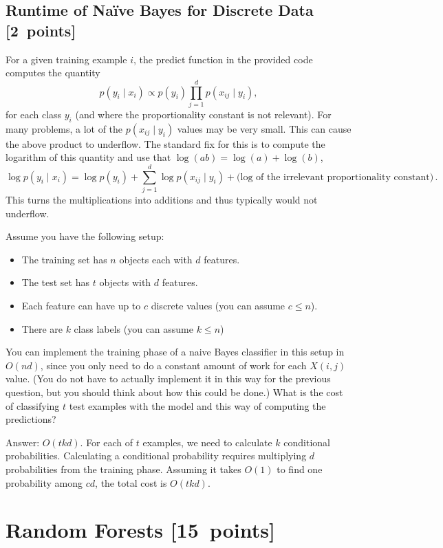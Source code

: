 \documentclass{article}
\newcommand{\blu}[1]{{\textcolor{blu}{#1}}}
\newenvironment{answer}{\par\begingroup\color{gre}Answer: }{\endgroup}
\let\ask\blu
\newcommand\pts[1]{\textcolor{pointscolour}{[#1~points]}}
\begin{document}
    \subsection{Runtime of Na\"ive Bayes for Discrete Data \pts{2}}

    For a given training example $i$, the predict function in the provided code computes the quantity
    \[
    p(y_i \mid x_i) \propto p(y_i)\prod_{j=1}^d p(x_{ij} \mid y_i),
    \]
    for each class $y_i$ (and where the proportionality constant is not relevant). For many problems, a lot of the $p(x_{ij} \mid y_i)$ values may be very small. This can cause the above product to underflow. The standard fix for this is to compute the logarithm of this quantity and use that $\log(ab) = \log(a)+\log(b)$,
    \[
    \log p(y_i \mid x_i) = \log p(y_i) + \sum_{j=1}^d \log p(x_{ij} \mid y_i) + \text{(log of the irrelevant proportionality constant)} \, .
    \]
    This turns the multiplications into additions and thus typically would not underflow.

    Assume you have the following setup:
    \begin{itemize}
        \item The training set has $n$ objects each with $d$ features.
        \item The test set has $t$ objects with $d$ features.
        \item Each feature can have up to $c$ discrete values (you can assume $c \leq n$).
        \item There are $k$ class labels (you can assume $k \leq n$)
    \end{itemize}
    You can implement the training phase of a naive Bayes classifier in this setup in $O(nd)$, since you only need to do a constant amount of work for each $X(i,j)$ value. (You do not have to actually implement it in this way for the previous question, but you should think about how this could be done.)
    \ask{What is the cost of classifying $t$ test examples with the model and this way of computing the predictions?}
    \begin{answer}
        $O(tkd)$. For each of $t$ examples, we need to calculate $k$ conditional probabilities. Calculating a conditional probability requires multiplying $d$ probabilities from the training phase. Assuming it takes $O(1)$ to find one probability among $cd$, the total cost is $O(tkd)$.
    \end{answer}


    \clearpage
    \section{Random Forests \pts{15}}
\end{document}
